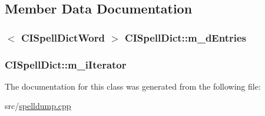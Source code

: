 \subsection{Member Data Documentation}
\hypertarget{classCISpellDict_a6d0bb5cdcaca887ea63ab84d7422f160}{
\subsubsection[{m\-\_\-d\-Entries}]{$<$ {\bf C\-I\-Spell\-Dict\-Word} $>$ C\-I\-Spell\-Dict\-::m\-\_\-d\-Entries\hspace{0.3cm}{\ttfamily [private]}}}\label{classCISpellDict_a6d0bb5cdcaca887ea63ab84d7422f160}
\hypertarget{classCISpellDict_a1156a340a0c04f95c1a62af1998e6d59}{
\subsubsection[{m\-\_\-i\-Iterator}]{ C\-I\-Spell\-Dict\-::m\-\_\-i\-Iterator\hspace{0.3cm}{\ttfamily [private]}}}\label{classCISpellDict_a1156a340a0c04f95c1a62af1998e6d59}


The documentation for this class was generated from the following file\-:\begin{DoxyCompactItemize}
\item 
src/\hyperlink{spelldump_8cpp}{spelldump.\-cpp}\end{DoxyCompactItemize}
